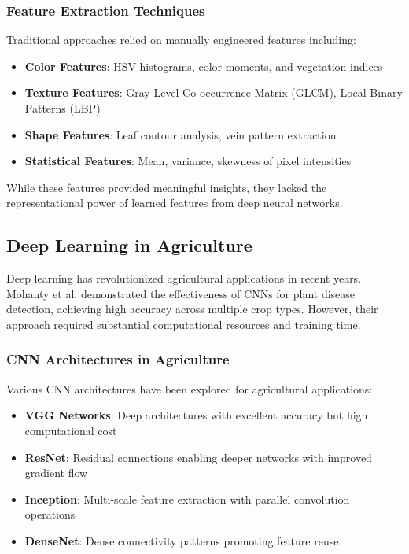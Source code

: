 \documentclass[conference,10pt,letterpaper]{IEEEtran}
\begin{document}
\subsubsection{Feature Extraction Techniques}
Traditional approaches relied on manually engineered features including:
\begin{itemize}
\item \textbf{Color Features}: HSV histograms, color moments, and vegetation indices
\item \textbf{Texture Features}: Gray-Level Co-occurrence Matrix (GLCM), Local Binary Patterns (LBP)
\item \textbf{Shape Features}: Leaf contour analysis, vein pattern extraction
\item \textbf{Statistical Features}: Mean, variance, skewness of pixel intensities
\end{itemize}

While these features provided meaningful insights, they lacked the representational power of learned features from deep neural networks.

\subsection{Deep Learning in Agriculture}

Deep learning has revolutionized agricultural applications in recent years. Mohanty et al. \cite{ref5} demonstrated the effectiveness of CNNs for plant disease detection, achieving high accuracy across multiple crop types. However, their approach required substantial computational resources and training time.

\subsubsection{CNN Architectures in Agriculture}
Various CNN architectures have been explored for agricultural applications:
\begin{itemize}
\item \textbf{VGG Networks}: Deep architectures with excellent accuracy but high computational cost
\item \textbf{ResNet}: Residual connections enabling deeper networks with improved gradient flow
\item \textbf{Inception}: Multi-scale feature extraction with parallel convolution operations
\item \textbf{DenseNet}: Dense connectivity patterns promoting feature reuse
\end{itemize}
\end{document}
